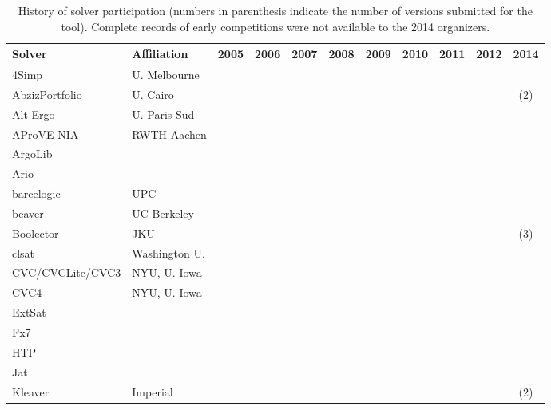 \documentclass[twoside,11pt]{article}
\begin{document}
\begin{table}[H]
\caption{History of solver participation (numbers in parenthesis indicate
the number of versions submitted for the tool). Complete records of early competitions were not available to the 2014 organizers.}
\label{Table:participants}
\renewcommand{\mark}[0]{\ding{51}}
\centering
\setlength{\tabcolsep}{1pt}
\begin{tabular}{|l@{\,\,}l|c|c|c|c|c|c|c|c|c|}
\hline
Solver & Affiliation & 2005 & 2006 & 2007 & 2008 & 2009 & 2010 & 2011 & 2012 & 2014 \\
\hline
4Simp                  & U. Melbourne 	&   &   &   &   &   &   &   &   & \mark  \\
AbzizPortfolio         & U. Cairo       &   &   &   &   &   &   &   & \mark & (2)\\
Alt-Ergo               & U. Paris Sud  &   &   &   & \mark &   &   &   &  &   \\
AProVE NIA             & RWTH Aachen    &   &   &   &   &   & \mark & \mark &   & \mark \\
ArgoLib                &   &   &   & \mark &   &   &   &   &  &   \\
Ario                   &   & \mark & \mark &   &   &   &   &   &  &   \\
barcelogic             & UPC            & \mark & \mark & \mark & \mark & \mark &   &   &   &   \\
beaver                 & UC Berkeley   &   &   &   & \mark & \mark &   &   &   &   \\
Boolector              & JKU            &   &   &   & \mark & \mark &   & \mark & \mark & (3)\\
clsat                  & Washington U.  &   &   &   & \mark & \mark &   &   &   &   \\
CVC/CVCLite/CVC3       & NYU, U. Iowa   & \mark & \mark & \mark & \mark & \mark & \mark & \mark & \mark & \mark \\
CVC4	                 & NYU, U. Iowa   &   &   &   &   &   & \mark & \mark & \mark & \mark \\
ExtSat                 &   &   & \mark &   &   &   &   &   &  &   \\
Fx7                    &   &   &   & \mark &   &   &   &   &  &   \\
HTP                    &   & \mark & \mark &   &   &   &   &   &  &   \\
Jat                    &   &   & \mark &   &   &   &   &   &  &   \\
Kleaver	               & Imperial       &   &   &   &   &   &   &   &   & (2) \\

\end{tabular}
\end{table}
\end{document}

